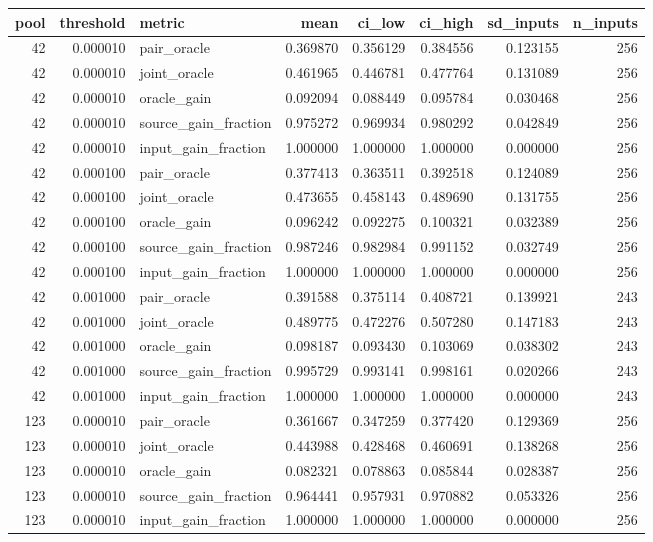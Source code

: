 \begin{tabular}{rrlrrrrr}
\toprule
pool & threshold & metric & mean & ci_low & ci_high & sd_inputs & n_inputs \\
\midrule
42 & 0.000010 & pair_oracle & 0.369870 & 0.356129 & 0.384556 & 0.123155 & 256 \\
42 & 0.000010 & joint_oracle & 0.461965 & 0.446781 & 0.477764 & 0.131089 & 256 \\
42 & 0.000010 & oracle_gain & 0.092094 & 0.088449 & 0.095784 & 0.030468 & 256 \\
42 & 0.000010 & source_gain_fraction & 0.975272 & 0.969934 & 0.980292 & 0.042849 & 256 \\
42 & 0.000010 & input_gain_fraction & 1.000000 & 1.000000 & 1.000000 & 0.000000 & 256 \\
42 & 0.000100 & pair_oracle & 0.377413 & 0.363511 & 0.392518 & 0.124089 & 256 \\
42 & 0.000100 & joint_oracle & 0.473655 & 0.458143 & 0.489690 & 0.131755 & 256 \\
42 & 0.000100 & oracle_gain & 0.096242 & 0.092275 & 0.100321 & 0.032389 & 256 \\
42 & 0.000100 & source_gain_fraction & 0.987246 & 0.982984 & 0.991152 & 0.032749 & 256 \\
42 & 0.000100 & input_gain_fraction & 1.000000 & 1.000000 & 1.000000 & 0.000000 & 256 \\
42 & 0.001000 & pair_oracle & 0.391588 & 0.375114 & 0.408721 & 0.139921 & 243 \\
42 & 0.001000 & joint_oracle & 0.489775 & 0.472276 & 0.507280 & 0.147183 & 243 \\
42 & 0.001000 & oracle_gain & 0.098187 & 0.093430 & 0.103069 & 0.038302 & 243 \\
42 & 0.001000 & source_gain_fraction & 0.995729 & 0.993141 & 0.998161 & 0.020266 & 243 \\
42 & 0.001000 & input_gain_fraction & 1.000000 & 1.000000 & 1.000000 & 0.000000 & 243 \\
123 & 0.000010 & pair_oracle & 0.361667 & 0.347259 & 0.377420 & 0.129369 & 256 \\
123 & 0.000010 & joint_oracle & 0.443988 & 0.428468 & 0.460691 & 0.138268 & 256 \\
123 & 0.000010 & oracle_gain & 0.082321 & 0.078863 & 0.085844 & 0.028387 & 256 \\
123 & 0.000010 & source_gain_fraction & 0.964441 & 0.957931 & 0.970882 & 0.053326 & 256 \\
123 & 0.000010 & input_gain_fraction & 1.000000 & 1.000000 & 1.000000 & 0.000000 & 256 \\

\end{tabular}
